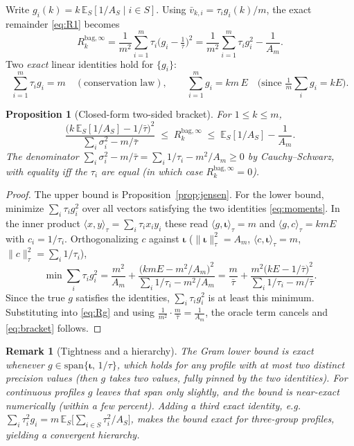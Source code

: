 \documentclass[11pt]{article}
\newcommand{\E}{\mathbb{E}}
\newcommand{\Rk}{R_k^{\mathrm{bag},\infty}}
\newcommand{\iotab}{\bm{\iota}}
\newtheorem{proposition}{Proposition}
\newtheorem{remark}{Remark}
\begin{document}
Write $g_i(k)=k\,\E_S[1/A_S\mid i\in S]$. Using $\bar v_{k,i}=\tau_i g_i(k)/m$, the exact
remainder \eqref{eq:R1} becomes
\begin{equation}\label{eq:Rg}
  \Rk=\frac1{m^2}\sum_{i=1}^m\tau_i\Big(g_i-\tfrac1{\bar\tau}\Big)^2
     =\frac1{m^2}\sum_{i=1}^m\tau_i g_i^2-\frac1{A_m}.
\end{equation}
Two \emph{exact} linear identities hold for $\{g_i\}$:
\begin{equation}\label{eq:moments}
  \sum_{i=1}^m\tau_i g_i=m\quad(\text{conservation law}),\qquad
  \sum_{i=1}^m g_i=km\,E\quad\Big(\text{since }\tfrac1m\textstyle\sum_i g_i=kE\Big).
\end{equation}

\begin{proposition}[Closed-form two-sided bracket]\label{prop:bracket}
For $1\le k\le m$,
\begin{equation}\label{eq:bracket}
  \frac{\big(k\,\E_S[1/A_S]-1/\bar\tau\big)^2}{\sum_i\sigma_i^2-m/\bar\tau}
  \;\le\;\Rk\;\le\;\E_S[1/A_S]-\frac1{A_m}.
\end{equation}
The denominator $\sum_i\sigma_i^2-m/\bar\tau=\sum_i1/\tau_i-m^2/A_m\ge0$ by Cauchy--Schwarz,
with equality iff the $\tau_i$ are equal (in which case $\Rk=0$).
\end{proposition}
\begin{proof}
The upper bound is Proposition~\ref{prop:jensen}. For the lower bound, minimize
$\sum_i\tau_ig_i^2$ over all vectors satisfying the two identities \eqref{eq:moments}. In the
inner product $\langle x,y\rangle_\tau=\sum_i\tau_ix_iy_i$ these read
$\langle g,\iotab\rangle_\tau=m$ and $\langle g,c\rangle_\tau=kmE$ with $c_i=1/\tau_i$.
Orthogonalizing $c$ against $\iotab$ ($\|\iotab\|_\tau^2=A_m$,
$\langle c,\iotab\rangle_\tau=m$, $\|c\|_\tau^2=\sum_i1/\tau_i$),
\[
  \min\sum_i\tau_ig_i^2=\frac{m^2}{A_m}
  +\frac{\big(kmE-m^2/A_m\big)^2}{\sum_i1/\tau_i-m^2/A_m}
  =\frac{m}{\bar\tau}+\frac{m^2\big(kE-1/\bar\tau\big)^2}{\sum_i1/\tau_i-m/\bar\tau}.
\]
Since the true $g$ satisfies the identities, $\sum_i\tau_ig_i^2$ is at least this minimum.
Substituting into \eqref{eq:Rg} and using $\frac1{m^2}\cdot\frac{m}{\bar\tau}=\frac1{A_m}$,
the oracle term cancels and \eqref{eq:bracket} follows.
\end{proof}

\begin{remark}[Tightness and a hierarchy]
The Gram lower bound is \emph{exact} whenever $g\in\mathrm{span}\{\iotab,\,1/\tau\}$, which
holds for any profile with at most two distinct precision values (then $g$ takes two values,
fully pinned by the two identities). For continuous profiles $g$ leaves that span only
slightly, and the bound is near-exact numerically (within a few percent). Adding a third
exact identity, e.g.\ $\sum_i\tau_i^2g_i=m\,\E_S\!\big[\sum_{i\in S}\tau_i^2/A_S\big]$, makes
the bound exact for three-group profiles, yielding a convergent hierarchy.
\end{remark}
\end{document}
